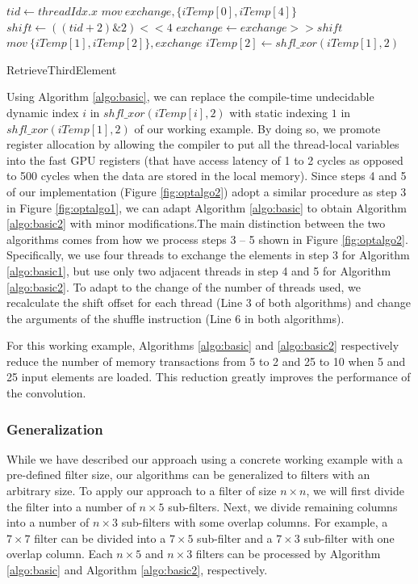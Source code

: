 \begin{algorithm}[t!]
\small

	$tid \gets threadIdx.x$\;
	$mov\ exchange, \{iTemp[0], iTemp[4]\}$\;
	$shift \gets ((tid+2)\&2)<<4$\;
	$exchange \gets exchange >> shift$\;
	$mov\ \{iTemp[1],iTemp[2]\}, exchange$\;
	$iTemp[2] \gets shfl\_xor(iTemp[1],2)$\;	
	
	\caption{RetrieveThirdElement}
	\label{algo:basic}
	
\end{algorithm}

Using Algorithm \ref{algo:basic}, we can replace the compile-time undecidable dynamic index $i$ in $shfl\_xor(iTemp[i],2)$ with static
indexing $1$ in $shfl\_xor(iTemp[1],2)$ of our working example. By doing so, we promote register allocation by allowing the compiler to put
all the thread-local variables into the fast GPU registers (that have access latency of 1 to 2 cycles as opposed to 500 cycles when the
data are stored in the local memory). Since steps 4 and 5 of our implementation (Figure \ref{fig:optalgo2}) adopt a similar procedure as
step 3 in Figure \ref{fig:optalgo1}, we can adapt Algorithm \ref{algo:basic} to obtain Algorithm \ref{algo:basic2} with minor
modifications.The main distinction between the two algorithms comes from how we process steps 3 – 5 shown in Figure \ref{fig:optalgo2}.
Specifically, we use four threads to exchange the elements in step 3 for Algorithm \ref{algo:basic1}, but use only two adjacent threads in
step 4 and 5 for Algorithm \ref{algo:basic2}. To adapt to the change of the number of threads used, we recalculate the shift offset for
each thread (Line 3 of both algorithms) and change the arguments of the shuffle instruction (Line 6 in both algorithms).


For this working example, Algorithms \ref{algo:basic} and \ref{algo:basic2} respectively reduce the number of memory transactions from 5 to
2 and 25 to 10 when 5 and 25 input elements are loaded. This reduction greatly improves the performance of the convolution.

\subsubsection{Generalization} While we have described our approach using a concrete working example with a pre-defined filter size, our
algorithms can be generalized to filters with an arbitrary size. To apply our approach to a filter of size $n \times n$, we will first
divide the filter into a number of $n \times 5$ sub-filters. Next, we divide remaining columns into a number of $n \times 3$ sub-filters
with some overlap columns. For example, a $7 \times 7$ filter can be divided into a $7 \times 5$ sub-filter and a $7 \times 3$ sub-filter
with one overlap column. Each $n \times 5$ and $n \times 3$ filters can be processed by Algorithm \ref{algo:basic} and Algorithm
\ref{algo:basic2}, respectively.






